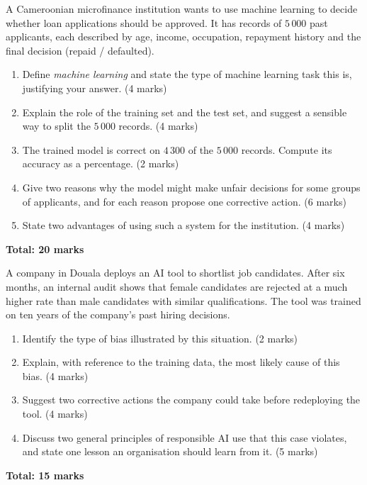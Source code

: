 \documentclass[11pt]{article}
\begin{document}
\begin{exercice}
A Cameroonian microfinance institution wants to use machine learning to decide whether loan applications should be approved. It has records of $5\,000$ past applicants, each described by age, income, occupation, repayment history and the final decision (repaid / defaulted).
\begin{enumerate}
\item [(a)] Define \emph{machine learning} and state the type of machine learning task this is, justifying your answer. \hfill (4 marks)
\item [(b)] Explain the role of the training set and the test set, and suggest a sensible way to split the $5\,000$ records. \hfill (4 marks)
\item [(c)] The trained model is correct on $4\,300$ of the $5\,000$ records. Compute its accuracy as a percentage. \hfill (2 marks)
\item [(d)] Give two reasons why the model might make unfair decisions for some groups of applicants, and for each reason propose one corrective action. \hfill (6 marks)
\item [(e)] State two advantages of using such a system for the institution. \hfill (4 marks)
\end{enumerate}
\hfill \textbf{Total: 20 marks}
\end{exercice}

\begin{exercice}
A company in Douala deploys an AI tool to shortlist job candidates. After six months, an internal audit shows that female candidates are rejected at a much higher rate than male candidates with similar qualifications. The tool was trained on ten years of the company's past hiring decisions.
\begin{enumerate}
\item [(a)] Identify the type of bias illustrated by this situation. \hfill (2 marks)
\item [(b)] Explain, with reference to the training data, the most likely cause of this bias. \hfill (4 marks)
\item [(c)] Suggest two corrective actions the company could take before redeploying the tool. \hfill (4 marks)
\item [(d)] Discuss two general principles of responsible AI use that this case violates, and state one lesson an organisation should learn from it. \hfill (5 marks)
\end{enumerate}
\hfill \textbf{Total: 15 marks}
\end{exercice}
\end{document}
